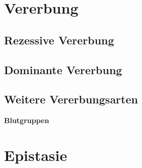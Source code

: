 
\section{Vererbung}\label{sec:vererbung}

\subsection{Rezessive Vererbung}\label{subsec:rezessive-vererbung}

\subsection{Dominante Vererbung}\label{subsec:dominante-vererbung}

\subsection{Weitere Vererbungsarten}\label{subsec:weitere-vererbungsarten}


\begin{bsp}
    \textbf{Blutgruppen}
\end{bsp}




\section{Epistasie}\label{sec:epistasie}

